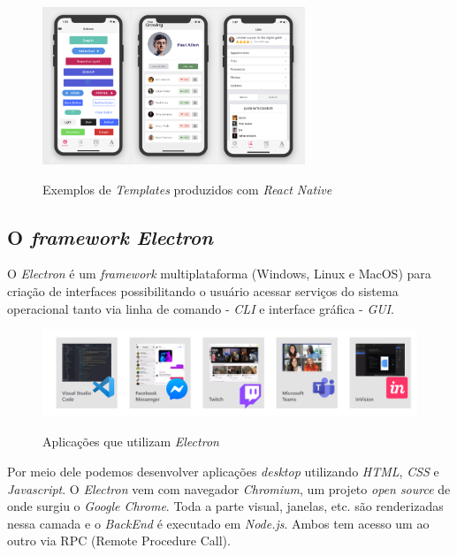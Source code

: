 \begin{figure}[H]
	\centering
	\caption{Exemplos de \textit{Templates} produzidos com \textit{React Native}}
	\includegraphics[width=0.7\textwidth]{figuras/react_native_elements.png}
	\label{fig:react-native}
\end{figure} 

\subsection{O \textit{framework Electron}}

O \textit{Electron} é um \textit{framework} multiplataforma (Windows, Linux e MacOS) para criação de interfaces possibilitando o usuário acessar serviços do sistema operacional tanto via linha de comando - \textit{CLI} e interface gráfica - \textit{GUI}.

\begin{figure}[H]
	\centering
	\caption{Aplicações que utilizam \textit{Electron}}
	\includegraphics[width=1.0\textwidth]{figuras/electron_apps.png}
	\label{fig:youcto-fluxo}
\end{figure} 

Por meio dele podemos desenvolver aplicações \textit{desktop} utilizando \textit{HTML}, \textit{CSS} e \textit{Javascript}. O \textit{Electron} vem com navegador \textit{Chromium}, um projeto \textit{open source} de onde surgiu o \textit{Google Chrome}. Toda a parte visual, janelas, etc. são renderizadas nessa camada e o \textit{BackEnd} é executado em \textit{Node.js}. Ambos tem acesso um ao outro via RPC (Remote Procedure Call).



